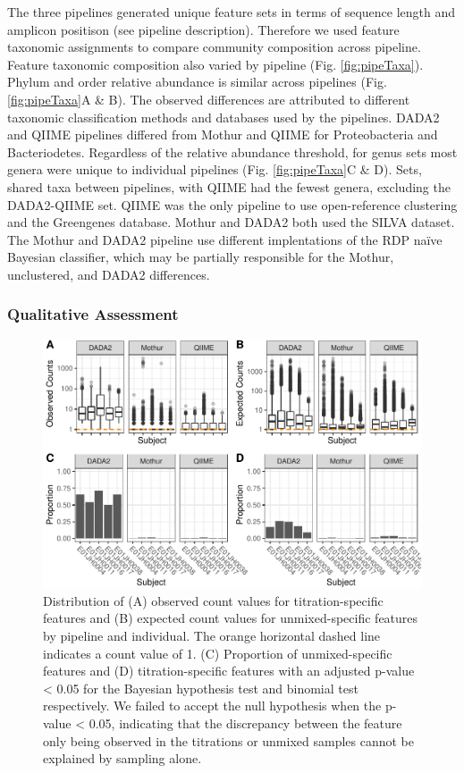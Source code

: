 \documentclass{bmcart}
\begin{document}
The three pipelines generated unique feature sets in terms of sequence
length and amplicon positison (see pipeline description). Therefore we
used feature taxonomic assignments to compare community composition across pipeline.
Feature taxonomic composition also varied by pipeline (Fig.
\ref{fig:pipeTaxa}). Phylum and order relative abundance is similar
across pipelines (Fig. \ref{fig:pipeTaxa}A \& B). The observed
differences are attributed to different taxonomic classification methods
and databases used by the pipelines. DADA2 and QIIME pipelines differed
from Mothur and QIIME for Proteobacteria and Bacteriodetes. Regardless
of the relative abundance threshold, for genus sets most genera were
unique to individual pipelines (Fig. \ref{fig:pipeTaxa}C \& D). Sets,
shared taxa between pipelines, with QIIME had the fewest genera,
excluding the DADA2-QIIME set. QIIME was the only pipeline to use
open-reference clustering and the Greengenes database. Mothur and DADA2
both used the SILVA dataset. The Mothur and DADA2 pipeline use different
implentations of the RDP naïve Bayesian classifier, which may be
partially responsible for the Mothur, unclustered, and DADA2
differences.

\subsubsection*{Qualitative Assessment}

\begin{figure}
\centering
\includegraphics{qualPlot-1.pdf}
\caption{\label{fig:qualPlot}Distribution of (A) observed count values for
titration-specific features and (B) expected count values for
unmixed-specific features by pipeline and individual. The orange
horizontal dashed line indicates a count value of 1. (C) Proportion of
unmixed-specific features and (D) titration-specific features with an
adjusted p-value \textless{} 0.05 for the Bayesian hypothesis test and
binomial test respectively. We failed to accept the null hypothesis when
the p-value \textless{} 0.05, indicating that the discrepancy between
the feature only being observed in the titrations or unmixed samples
cannot be explained by sampling alone.}
\end{figure}
\end{document}
